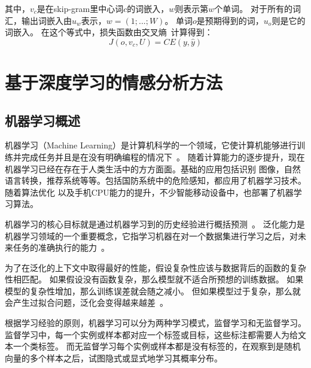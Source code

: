 其中，${v_{c}}$是在skip-gram里中心词${c}$的词嵌入，${w}$则表示第${w}$个单词。
对于所有的词汇，输出词嵌入由${u_{w}}$表示，${w=\left ( 1;...;W \right )}$。
单词${o}$是预期得到的词，${u_{o}}$则是它的词嵌入。
在这个等式中，损失函数由交叉熵~计算得到：
\begin{equation}
    J\left ( o,v_{c},U \right )=CE\left ( y,\widehat{y} \right )
\end{equation}

\section{基于深度学习的情感分析方法}
\subsection{机器学习概述}
机器学习（Machine Learning）是计算机科学的一个领域，它使计算机能够进行训练并完成任务并且是在没有明确编程的情况下~。
随着计算能力的逐步提升，现在机器学习已经在存在于人类生活中的方方面面。基础的应用包括识别
图像，自然语言转换，推荐系统等等。包括国防系统中的危险感知，都应用了机器学习技术。随着算法优化
以及手机CPU能力的提升，不少智能移动设备中，也部署了机器学习算法。

机器学习的核心目标就是通过机器学习到的历史经验进行概括预测~。
泛化能力是机器学习领域的一个重要概念，它指学习机器在对一个数据集进行学习之后，对未来任务的准确执行的能力~。

为了在泛化的上下文中取得最好的性能，假设复杂性应该与数据背后的函数的复杂性相匹配。
如果假设没有函数复杂，那么模型就不适合所预想的训练数据。
如果模型的复杂性增加，那么训练误差就会随之减小。
但如果模型过于复杂，那么就会产生过拟合问题，泛化会变得越来越差~。

根据学习经验的原则，机器学习可以分为两种学习模式，监督学习和无监督学习。
监督学习中，每一个实例或样本都对应一个标签或目标，这些标注都需要人为给文本一个类标签。
而无监督学习每个实例或样本都是没有标签的，在观察到是随机向量的多个样本之后，试图隐式或显式地学习其概率分布。


